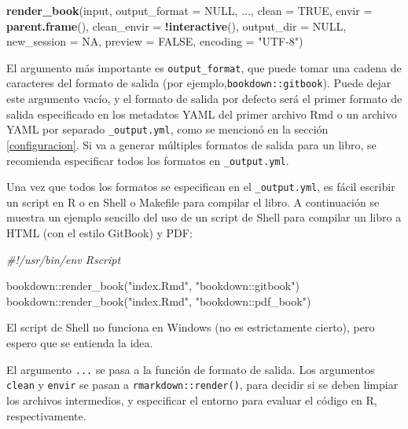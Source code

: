 \documentclass[12pt,]{krantz}
\makeatletter
\newenvironment{Shaded}{\begin{snugshade}}{\end{snugshade}}
\newcommand{\KeywordTok}[1]{\textcolor[rgb]{0.13,0.29,0.53}{\textbf{#1}}}
\newcommand{\DataTypeTok}[1]{\textcolor[rgb]{0.13,0.29,0.53}{#1}}
\newcommand{\StringTok}[1]{\textcolor[rgb]{0.31,0.60,0.02}{#1}}
\newcommand{\CommentTok}[1]{\textcolor[rgb]{0.56,0.35,0.01}{\textit{#1}}}
\newcommand{\OtherTok}[1]{\textcolor[rgb]{0.56,0.35,0.01}{#1}}
\newcommand{\OperatorTok}[1]{\textcolor[rgb]{0.81,0.36,0.00}{\textbf{#1}}}
\newcommand{\ExtensionTok}[1]{#1}
\newcommand{\NormalTok}[1]{#1}
\newenvironment{kframe}{%
\medskip{}
\setlength{\fboxsep}{.8em}
 \def\at@end@of@kframe{}%
 \ifinner\ifhmode%
  \def\at@end@of@kframe{\end{minipage}}%
  \begin{minipage}{\columnwidth}%
 \fi\fi%
 \def\FrameCommand##1{\hskip\@totalleftmargin \hskip-\fboxsep
 \colorbox{shadecolor}{##1}\hskip-\fboxsep
     \hskip-\linewidth \hskip-\@totalleftmargin \hskip\columnwidth}%
 \MakeFramed {\advance\hsize-\width
   \@totalleftmargin\z@ \linewidth\hsize
   \@setminipage}}%
 {\par\unskip\endMakeFramed%
 \at@end@of@kframe}
\renewenvironment{Shaded}{\begin{kframe}}{\end{kframe}}
\theoremstyle{definition}
\theoremstyle{definition}
\theoremstyle{definition}
\theoremstyle{remark}
\makeatother
\begin{document}
\begin{Shaded}
\begin{Highlighting}[]
\KeywordTok{render_book}\NormalTok{(input, }\DataTypeTok{output_format =} \OtherTok{NULL}\NormalTok{, ...,}
  \DataTypeTok{clean =} \OtherTok{TRUE}\NormalTok{, }\DataTypeTok{envir =} \KeywordTok{parent.frame}\NormalTok{(),}
  \DataTypeTok{clean_envir =} \OperatorTok{!}\KeywordTok{interactive}\NormalTok{(), }\DataTypeTok{output_dir =} \OtherTok{NULL}\NormalTok{,}
  \DataTypeTok{new_session =} \OtherTok{NA}\NormalTok{, }\DataTypeTok{preview =} \OtherTok{FALSE}\NormalTok{,}
  \DataTypeTok{encoding =} \StringTok{"UTF-8"}\NormalTok{)}
\end{Highlighting}
\end{Shaded}

El argumento más importante es \texttt{output\_format}, que puede tomar
una cadena de caracteres del formato de salida (por
ejemplo,\texttt{\textquotesingle{}bookdown::gitbook\textquotesingle{}}).
Puede dejar este argumento vacío, y el formato de salida por defecto
será el primer formato de salida especificado en los metadatos YAML del
primer archivo Rmd o un archivo YAML por separado \texttt{\_output.yml},
como se mencionó en la sección \ref{configuracion}. Si va a generar
múltiples formatos de salida para un libro, se recomienda especificar
todos los formatos en \texttt{\_output.yml}.

Una vez que todos los formatos se especifican en el
\texttt{\_output.yml}, es fácil escribir un script en R o en Shell o
Makefile para compilar el libro. A continuación se muestra un ejemplo
sencillo del uso de un script de Shell para compilar un libro a HTML
(con el estilo GitBook) y PDF:

\begin{Shaded}
\begin{Highlighting}[]
\CommentTok{#!/usr/bin/env Rscript}

\ExtensionTok{bookdown}\NormalTok{::render_book(}\StringTok{"index.Rmd"}\NormalTok{, }\StringTok{"bookdown::gitbook"}\NormalTok{)}
\ExtensionTok{bookdown}\NormalTok{::render_book(}\StringTok{"index.Rmd"}\NormalTok{, }\StringTok{"bookdown::pdf_book"}\NormalTok{)}
\end{Highlighting}
\end{Shaded}

El script de Shell no funciona en Windows (no es estrictamente cierto),
pero espero que se entienda la idea.

El argumento \texttt{...} se pasa a la función de formato de salida. Los
argumentos \texttt{clean} y \texttt{envir} se pasan a
\texttt{rmarkdown::render()}, para decidir si se deben limpiar los
archivos intermedios, y especificar el entorno para evaluar el código en
R, respectivamente.
\end{document}
